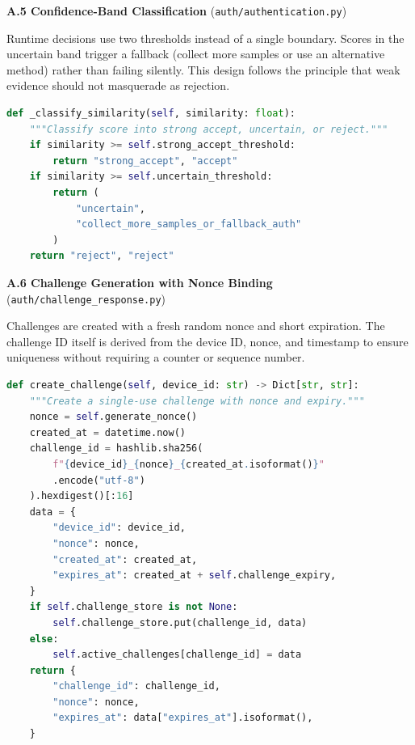 \vspace{0.5cm}
\noindent\textbf{A.5 \quad Confidence-Band Classification} (\texttt{auth/authentication.py})

\vspace{0.3cm}
Runtime decisions use two thresholds instead of a single boundary. Scores in the uncertain band trigger a fallback (collect more samples or use an alternative method) rather than failing silently. This design follows the principle that weak evidence should not masquerade as rejection.

\begin{lstlisting}[language=Python, basicstyle=\ttfamily\small]
def _classify_similarity(self, similarity: float):
    """Classify score into strong accept, uncertain, or reject."""
    if similarity >= self.strong_accept_threshold:
        return "strong_accept", "accept"
    if similarity >= self.uncertain_threshold:
        return (
            "uncertain",
            "collect_more_samples_or_fallback_auth"
        )
    return "reject", "reject"
\end{lstlisting}

\vspace{0.5cm}
\noindent\textbf{A.6 \quad Challenge Generation with Nonce Binding} (\texttt{auth/challenge\_response.py})

\vspace{0.3cm}
Challenges are created with a fresh random nonce and short expiration. The challenge ID itself is derived from the device ID, nonce, and timestamp to ensure uniqueness without requiring a counter or sequence number.

\begin{lstlisting}[language=Python, basicstyle=\ttfamily\small]
def create_challenge(self, device_id: str) -> Dict[str, str]:
    """Create a single-use challenge with nonce and expiry."""
    nonce = self.generate_nonce()
    created_at = datetime.now()
    challenge_id = hashlib.sha256(
        f"{device_id}_{nonce}_{created_at.isoformat()}"
        .encode("utf-8")
    ).hexdigest()[:16]
    data = {
        "device_id": device_id,
        "nonce": nonce,
        "created_at": created_at,
        "expires_at": created_at + self.challenge_expiry,
    }
    if self.challenge_store is not None:
        self.challenge_store.put(challenge_id, data)
    else:
        self.active_challenges[challenge_id] = data
    return {
        "challenge_id": challenge_id,
        "nonce": nonce,
        "expires_at": data["expires_at"].isoformat(),
    }
\end{lstlisting}

